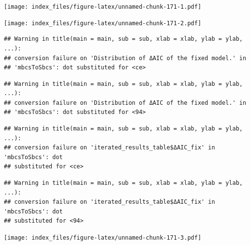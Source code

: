 \documentclass[
]{article}
\newenvironment{Shaded}{\begin{snugshade}}{\end{snugshade}}
\newcommand{\AttributeTok}[1]{\textcolor[rgb]{0.77,0.63,0.00}{#1}}
\newcommand{\FunctionTok}[1]{\textcolor[rgb]{0.00,0.00,0.00}{#1}}
\newcommand{\NormalTok}[1]{#1}
\newcommand{\SpecialCharTok}[1]{\textcolor[rgb]{0.00,0.00,0.00}{#1}}
\newcommand{\StringTok}[1]{\textcolor[rgb]{0.31,0.60,0.02}{#1}}
\begin{document}
\texttt{[image: index\_files/figure-latex/unnamed-chunk-171-1.pdf]}

\begin{Shaded}
\end{Shaded}

\texttt{[image: index\_files/figure-latex/unnamed-chunk-171-2.pdf]}

\begin{Shaded}
\end{Shaded}

\begin{verbatim}
## Warning in title(main = main, sub = sub, xlab = xlab, ylab = ylab, ...):
## conversion failure on 'Distribution of ΔAIC of the fixed model.' in
## 'mbcsToSbcs': dot substituted for <ce>
\end{verbatim}

\begin{verbatim}
## Warning in title(main = main, sub = sub, xlab = xlab, ylab = ylab, ...):
## conversion failure on 'Distribution of ΔAIC of the fixed model.' in
## 'mbcsToSbcs': dot substituted for <94>
\end{verbatim}

\begin{verbatim}
## Warning in title(main = main, sub = sub, xlab = xlab, ylab = ylab, ...):
## conversion failure on 'iterated_results_table$ΔAIC_fix' in 'mbcsToSbcs': dot
## substituted for <ce>
\end{verbatim}

\begin{verbatim}
## Warning in title(main = main, sub = sub, xlab = xlab, ylab = ylab, ...):
## conversion failure on 'iterated_results_table$ΔAIC_fix' in 'mbcsToSbcs': dot
## substituted for <94>
\end{verbatim}

\texttt{[image: index\_files/figure-latex/unnamed-chunk-171-3.pdf]}

\begin{Shaded}
\end{Shaded}
\end{document}
